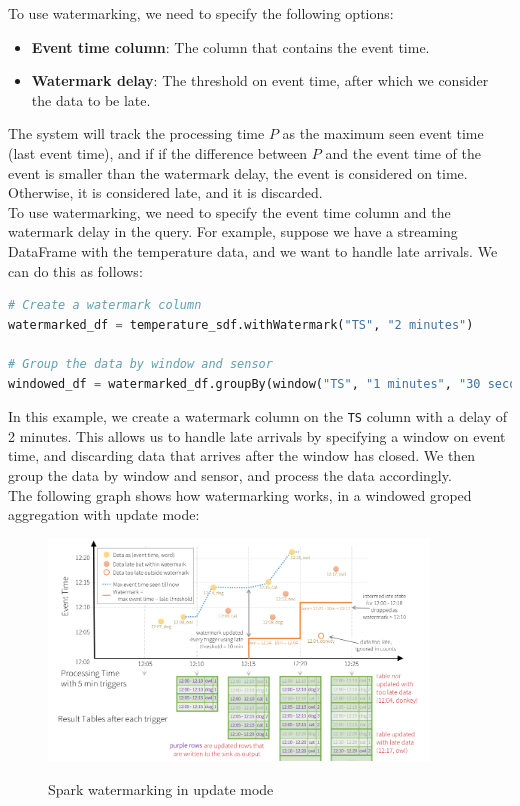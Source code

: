 To use watermarking, we need to specify the following options:

\begin{itemize}
    \item \textbf{Event time column}: The column that contains the event time.
    \item \textbf{Watermark delay}: The threshold on event time, after which we consider the data to be late.
\end{itemize}

The system will track the processing time $P$ as the maximum seen event time (last event time), and if
if the difference between $P$ and the event time of the event is smaller than the watermark delay, the
event is considered on time. Otherwise, it is considered late, and it is discarded.\\

To use watermarking, we need to specify the event time column and the watermark delay in the query.
For example, suppose we have a streaming DataFrame with the temperature data, and we want to handle
late arrivals. We can do this as follows:

\begin{lstlisting}[language=Python]
# Create a watermark column
watermarked_df = temperature_sdf.withWatermark("TS", "2 minutes")

# Group the data by window and sensor
windowed_df = watermarked_df.groupBy(window("TS", "1 minutes", "30 seconds"), "SENSOR")
\end{lstlisting}

In this example, we create a watermark column on the \texttt{TS} column with a delay of 2 minutes.
This allows us to handle late arrivals by specifying a window on event time, and discarding data that
arrives after the window has closed. We then group the data by window and sensor, and process the data
accordingly.\\

The following graph shows how watermarking works, in a windowed groped aggregation with update mode:

\begin{figure}[H]
    \centering
    \includegraphics[width=0.9\textwidth]{figures/spark_watermark_update.png}
    \label{fig:spark_watermark_update}
    \caption{Spark watermarking in update mode}
\end{figure}

